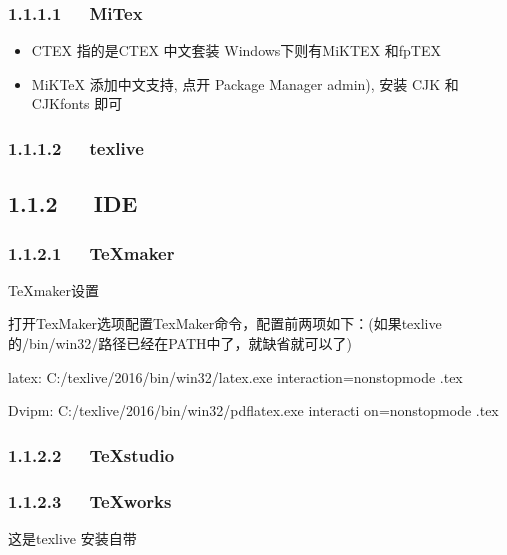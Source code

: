 \documentclass[letterpaper,12pt,english]{sphinxmanual}
\begin{document}
\subsubsection{1.1.1.1   MiTex}
\label{\detokenize{001software/001install/LaTex:mitex}}\begin{itemize}
\item {} 
CTEX 指的是CTEX 中文套装
Windows下则有MiKTEX 和fpTEX

\item {} 
MiKTeX
添加中文支持, 点开 Package Manager admin), 安装 CJK 和 CJK\sphinxhyphen{}fonts 即可

\end{itemize}


\subsubsection{1.1.1.2   texlive}
\label{\detokenize{001software/001install/LaTex:texlive}}

\subsection{1.1.2   IDE}
\label{\detokenize{001software/001install/LaTex:ide}}

\subsubsection{1.1.2.1   TeXmaker}
\label{\detokenize{001software/001install/LaTex:texmaker}}
\begin{sphinxVerbatim}[commandchars=\\\{\}]
TeXmaker设置

打开TexMaker\PYGZhy{}\PYGZgt{}选项\PYGZhy{}\PYGZgt{}配置TexMaker\PYGZhy{}\PYGZgt{}命令，配置前两项如下：(如果texlive的/bin/win32/路径已经在PATH中了，就缺省就可以了)

latex: \PYGZdq{}C:/texlive/2016/bin/win32/latex.exe\PYGZdq{} \PYGZhy{}interaction=nonstopmode \PYGZpc{}.tex

Dvipm: \PYGZdq{}C:/texlive/2016/bin/win32/pdflatex.exe\PYGZdq{} \PYGZhy{}interacti on=nonstopmode \PYGZpc{}.tex
\end{sphinxVerbatim}


\subsubsection{1.1.2.2   TeXstudio}
\label{\detokenize{001software/001install/LaTex:texstudio}}

\subsubsection{1.1.2.3   TeXworks}
\label{\detokenize{001software/001install/LaTex:texworks}}
这是texlive 安装自带
\end{document}
